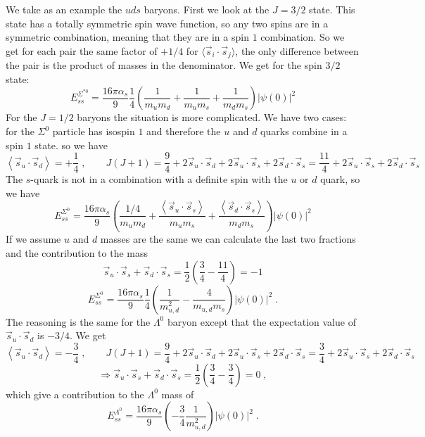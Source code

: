 \documentclass[12pt]{article}
\begin{document}
We take as an example the $uds$ baryons. First we look at the $J=3/2$ state. This state has a totally symmetric spin wave function, so any two spins are in a symmetric combination, meaning that they are in a spin $1$ combination. So we get for each pair the same factor of $+1/4$ for $\langle \vec s_i\cdot \vec s_j\rangle $, the only difference between the pair is the product of masses in the denominator. We get for the spin $3/2$ state:
\[E_{ss}^{\Sigma^{*0}}
=
\displaystyle\frac{16\pi\alpha_s}{9}\frac{1}{4}\left(
\frac{1}{m_u m_d}
+
\frac{1}{m_u m_s}
+
\frac{1}{m_d m_s}
\right)|\psi(0)|^2
\]  
For the $J=1/2$ baryons the situation is more complicated. We have two cases: for the $\Sigma^0$ particle has isospin $1$ and therefore the $u$ and $d$ quarks combine in a spin $1$ state. so we have 
\[\left<\vec s_u \cdot \vec s_d\right>=+\frac14\;,
\qquad J(J+1)=\frac{9}{4}
+2 \vec s_u\cdot \vec s_d
+2 \vec s_u\cdot \vec s_s
+2 \vec s_d\cdot \vec s_s
=\frac{11}{4}+2 \vec s_u\cdot \vec s_s
+2 \vec s_d\cdot \vec s_s
\]
The $s$-quark is not in a combination with a definite spin with the $u$ or $d$ quark, so we have
\[E_{ss}^{\Sigma^{0}}
=
\displaystyle\frac{16\pi\alpha_s}{9}\left(
\frac{1/4}{m_u m_d}
+
\frac{\left<\vec s_u\cdot \vec s_s\right>}{m_u m_s}
+
\frac{\left<\vec s_d\cdot \vec s_s\right>}{m_d m_s}
\right)|\psi(0)|^2
\]  
If we assume $u$ and $d$ masses are the same we can calculate the last two fractions and the contribution to the mass
\[\vec s_u\cdot \vec s_s
+\vec s_d\cdot \vec s_s=\frac{1}{2}\left(\frac34-\frac{11}{4}\right)=-1
\]
\[E_{ss}^{\Sigma^{0}}
=
\displaystyle\frac{16\pi\alpha_s}{9}\frac14\left(
\frac{1}{m_{u,d}^2}
-
\frac{4}{m_{u,d} m_s}
\right)|\psi(0)|^2\;.
\]  
The reasoning is the same for the $\Lambda^0$ baryon except that the expectation value of $\vec s_u\cdot \vec s_d$ is $-3/4$. We get
\[\left<\vec s_u \cdot \vec s_d\right>=-\frac34\;,
\qquad J(J+1)=\frac{9}{4}
+2 \vec s_u\cdot \vec s_d
+2 \vec s_u\cdot \vec s_s
+2 \vec s_d\cdot \vec s_s
=\frac{3}{4}+2 \vec s_u\cdot \vec s_s
+2 \vec s_d\cdot \vec s_s
\]
\[\Rightarrow\vec s_u\cdot \vec s_s
+\vec s_d\cdot \vec s_s=\frac{1}{2}\left(\frac34-\frac{3}{4}\right)=0\;, \]
which give a contribution to the $\Lambda^0$ mass of
\[E_{ss}^{\Lambda^{0}}
=
\displaystyle\frac{16\pi\alpha_s}{9}\left(
-\frac34\frac{1}{m_{u,d}^2}
\right)|\psi(0)|^2\;.
\]  
\end{document}
